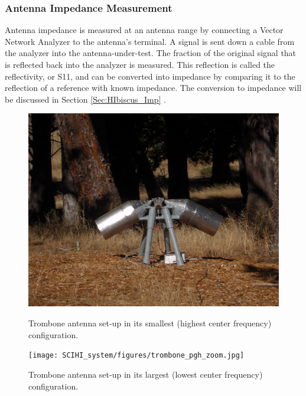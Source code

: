 \subsubsection{Antenna Impedance Measurement} 

Antenna impedance is measured at an antenna range by connecting a Vector Network Analyzer to the antenna's terminal. A signal is sent down a cable from the analyzer into the antenna-under-test. The fraction of the original signal that is reflected back into the analyzer is measured. This reflection is called the reflectivity, or S11, and can be converted into impedance by comparing it to the reflection of a reference with known impedance. The conversion to impedance will be discussed in Section \ref{Sec:HIbiscus_Imp} \cite{stutzman1981}.

\begin{figure}[htb]
\centering
\begin{minipage}[b]{0.45\textwidth}
\centering
\includegraphics[width=0.95\linewidth]{SCIHI_system/figures/trombone_guad_small.jpg}
\caption{Trombone antenna set-up in its smallest (highest center frequency) configuration.}
\label{Fig:trombone_small}
\end{minipage}%
\begin{minipage}[b]{0.02\textwidth}
\hspace{1cm}
\end{minipage}%
\begin{minipage}[b]{0.51\textwidth}
\centering
\texttt{[image: SCIHI\_system/figures/trombone\_pgh\_zoom.jpg]}
\caption{Trombone antenna set-up in its largest (lowest center frequency) configuration.}
\label{Fig:trombone_large}
\end{minipage}
\end{figure}


